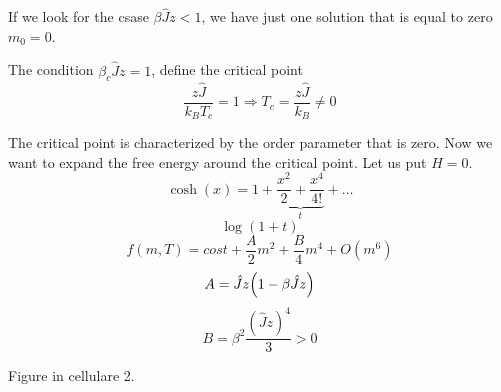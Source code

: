 \documentclass[../main/main.tex]{subfiles}
\begin{document}
If we look for the csase \( \beta \hat{J} z < 1  \), we have just one solution that is equal to zero \( m_0 = 0 \).

The condition \( \beta_c \hat{J} z = 1  \), define the critical point
\begin{equation}
  \frac{z \hat{J} }{k_B T_c} = 1 \Rightarrow T_c = \frac{z \hat{J} }{k_B} \neq 0
\end{equation}

The critical point is characterized by the order parameter that is zero. Now we want to expand the free energy around the critical point. Let us put \( H=0 \).
\begin{equation}
  \cosh (x) = 1 + \underbrace{\frac{x^2}{2} + \frac{x^4}{4!}}_{t}  + \dots
\end{equation}
\begin{equation}
  \log{(1+t)}
\end{equation}
\begin{equation}
  f(m,T) = cost + \frac{A}{2} m^2 + \frac{B}{4} m^4 + O (m^6)
\end{equation}
\begin{equation}
  A = \hat{J} z \qty(1- \beta \hat{J} z)
\end{equation}
\begin{equation}
  B = \beta ^2 \frac{(\hat{J}z )^4}{3} > 0
\end{equation}

Figure in cellulare 2. 
\end{document}

